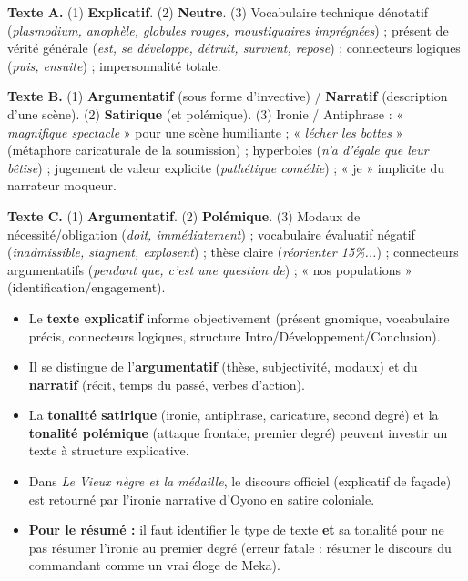 \documentclass[11pt]{article}
\begin{document}
\begin{corrige}[Exercice n°1]
\textbf{Texte A.} (1) \textbf{Explicatif}. (2) \textbf{Neutre}. (3) Vocabulaire technique dénotatif (\emph{plasmodium, anophèle, globules rouges, moustiquaires imprégnées}) ; présent de vérité générale (\emph{est, se développe, détruit, survient, repose}) ; connecteurs logiques (\emph{puis, ensuite}) ; impersonnalité totale.

\textbf{Texte B.} (1) \textbf{Argumentatif} (sous forme d'invective) / \textbf{Narratif} (description d'une scène). (2) \textbf{Satirique} (et polémique). (3) Ironie / Antiphrase : « \emph{magnifique spectacle} » pour une scène humiliante ; « \emph{lécher les bottes} » (métaphore caricaturale de la soumission) ; hyperboles (\emph{n'a d'égale que leur bêtise}) ; jugement de valeur explicite (\emph{pathétique comédie}) ; « je » implicite du narrateur moqueur.

\textbf{Texte C.} (1) \textbf{Argumentatif}. (2) \textbf{Polémique}. (3) Modaux de nécessité/obligation (\emph{doit, immédiatement}) ; vocabulaire évaluatif négatif (\emph{inadmissible, stagnent, explosent}) ; thèse claire (\emph{réorienter 15\%...}) ; connecteurs argumentatifs (\emph{pendant que, c'est une question de}) ; « nos populations » (identification/engagement).
\end{corrige}

\begin{aretenir}
\begin{itemize}
    \item Le \textbf{texte explicatif} informe objectivement (présent gnomique, vocabulaire précis, connecteurs logiques, structure Intro/Développement/Conclusion).
    \item Il se distingue de l'\textbf{argumentatif} (thèse, subjectivité, modaux) et du \textbf{narratif} (récit, temps du passé, verbes d'action).
    \item La \textbf{tonalité satirique} (ironie, antiphrase, caricature, second degré) et la \textbf{tonalité polémique} (attaque frontale, premier degré) peuvent investir un texte à structure explicative.
    \item Dans \emph{Le Vieux nègre et la médaille}, le discours officiel (explicatif de façade) est retourné par l'ironie narrative d'Oyono en satire coloniale.
    \item \textbf{Pour le résumé :} il faut identifier le type de texte \textbf{et} sa tonalité pour ne pas résumer l'ironie au premier degré (erreur fatale : résumer le discours du commandant comme un vrai éloge de Meka).
\end{itemize}
\end{aretenir}
\end{document}
